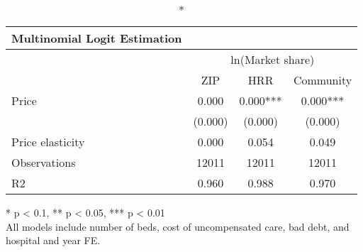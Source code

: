 \setlength{\LTpost}{0mm}
\begin{longtable}{lccc}
\caption*{
{\large Multinomial Logit Estimation}
} \\ 
\toprule
 & \multicolumn{3}{c}{ln(Market share)} \\ 
\cmidrule(lr){2-4}
  & ZIP & HRR & Community \\ 
\midrule\addlinespace[2.5pt]
Price & 0.000 & 0.000*** & 0.000*** \\ 
 & (0.000) & (0.000) & (0.000) \\ 
Price elasticity & 0.000 & 0.054 & 0.049 \\ 
Observations & 12011 & 12011 & 12011 \\ 
R2 & 0.960 & 0.988 & 0.970 \\ 
\bottomrule
\end{longtable}
\begin{minipage}{\linewidth}
* p < 0.1, ** p < 0.05, *** p < 0.01\\
All models include number of beds, cost of uncompensated care, bad debt, and hospital and year FE.\\
\end{minipage}

